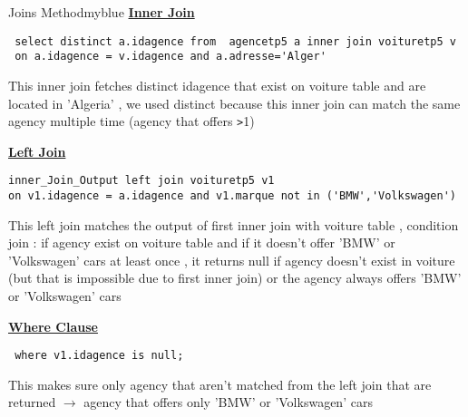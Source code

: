 \newpage
\begin{prettyBox}{Joins Method}{myblue}
\textbf{\underline{Inner Join}}
\begin{lstlisting}
 select distinct a.idagence from  agencetp5 a inner join voituretp5 v 
 on a.idagence = v.idagence and a.adresse='Alger'
\end{lstlisting}
This inner join fetches distinct idagence that exist on voiture table and are located in 'Algeria'
, we used distinct because this inner join can match the same agency multiple time (agency that offers \texttt{>}1)

\vspace{0.25cm}
\textbf{\underline{Left Join}}
\begin{lstlisting}
inner_Join_Output left join voituretp5 v1 
on v1.idagence = a.idagence and v1.marque not in ('BMW','Volkswagen') 
\end{lstlisting}
This left join matches the output of first inner join with voiture table , condition join : if agency exist on voiture table
and if it doesn't offer 'BMW' or 'Volkswagen' cars at least once , it returns null if agency doesn't exist in voiture (but that is
impossible due to first inner join) or the agency always offers 'BMW' or 'Volkswagen' cars

\vspace{0.25cm}
\textbf{\underline{Where Clause}}
\begin{lstlisting}
 where v1.idagence is null;
\end{lstlisting}
This makes sure only agency that aren't matched from the left join that are returned \(\rightarrow\) agency that offers only 'BMW' or 'Volkswagen' cars 
\end{prettyBox}
